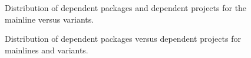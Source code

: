 \begin{figure}%
    \centering
    \qquad
    \caption{Distribution of dependent packages and dependent projects for the mainline versus variants.}%
    \label{fig:packages_and_projects}%
\end{figure}


\begin{figure}%
    \centering
    \qquad
    \caption{Distribution of dependent packages versus dependent projects for mainlines and variants.}%
    \label{fig:mainline_variants_packages}%
\end{figure}


